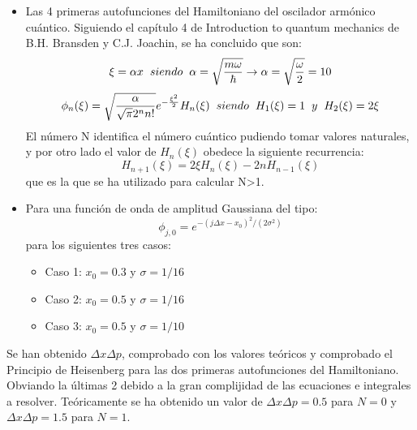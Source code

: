 \documentclass[12pt,paper]{article}
\begin{document}
\begin{itemize}
    \item Las 4 primeras autofunciones del Hamiltoniano del oscilador armónico cuántico. Siguiendo el capítulo 4 de Introduction to quantum mechanics de B.H. Bransden y C.J. Joachin, se ha concluido que son: 
\begin{equation*}
    \xi = \alpha x \hspace{2mm} siendo \hspace{2mm} \alpha = \sqrt{\frac{m \omega}{\hbar}} \rightarrow \alpha = \sqrt{\frac{ \omega}{2}} = 10
\end{equation*}
\begin{equation*}
    \phi_n(\xi) = \sqrt{\frac{\alpha}{\sqrt{\pi} 2^n n!}}e^{-\frac{\xi^2}{2}}H_n(\xi) \hspace{2mm} siendo \hspace{2mm} H_1(\xi) = 1 \hspace{2mm} y \hspace{2mm} H_2(\xi) = 2 \xi
\end{equation*}
El número N identifica el número cuántico pudiendo tomar valores naturales, y por otro lado el valor de $H_n(\xi)$ obedece la siguiente recurrencia:
\begin{equation*}
    H_{n+1}(\xi) = 2 \xi H_n(\xi) - 2n H_{n-1}(\xi)
\end{equation*}
que es la que se ha utilizado para calcular N>1.
    \item Para una función de onda de amplitud Gaussiana del tipo:
    \begin{equation*}
        \phi_{j,0} = e^{-(j \Delta x - x_0)^2/(2 \sigma^2)}
    \end{equation*}
    para los siguientes tres casos:
    \begin{itemize}
        \item Caso 1: $x_0 = 0.3$ y $\sigma = 1/16$
        \item Caso 2: $x_0 = 0.5$ y $\sigma = 1/16$
        \item Caso 3: $x_0 = 0.5$ y $\sigma = 1/10$
    \end{itemize}
\end{itemize}

Se han obtenido $\Delta x \Delta p$, comprobado con los valores teóricos y comprobado el Principio de Heisenberg para las dos primeras autofunciones del Hamiltoniano. Obviando la últimas 2 debido a la gran complijidad de las ecuaciones e integrales a resolver. Teóricamente se ha obtenido un valor de $\Delta x \Delta p = 0.5$ para $N=0$ y $\Delta x \Delta p = 1.5$ para $N=1$.\\
\end{document}
